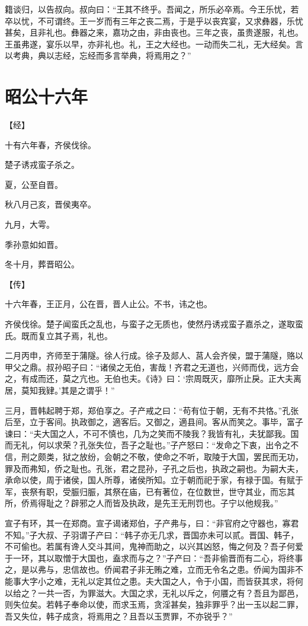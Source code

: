 \documentclass[a4paper,12pt,UTF8,twoside]{ctexbook}
\begin{document}
籍谈归，以告叔向。叔向曰：“王其不终乎。吾闻之，所乐必卒焉。今王乐忧，若卒以忧，不可谓终。王一岁而有三年之丧二焉，于是乎以丧宾宴，又求彝器，乐忧甚矣，且非礼也。彝器之来，嘉功之由，非由丧也。三年之丧，虽贵遂服，礼也。王虽弗遂，宴乐以早，亦非礼也。礼，王之大经也。一动而失二礼，无大经矣。言以考典，典以志经，忘经而多言举典，将焉用之？”


\section{昭公十六年}



【经】

十有六年春，齐侯伐徐。

楚子诱戎蛮子杀之。

夏，公至自晋。

秋八月己亥，晋侯夷卒。

九月，大雩。

季孙意如如晋。

冬十月，葬晋昭公。

【传】

十六年春，王正月，公在晋，晋人止公。不书，讳之也。

齐侯伐徐。楚子闻蛮氏之乱也，与蛮子之无质也，使然丹诱戎蛮子嘉杀之，遂取蛮氏。既而复立其子焉，礼也。

二月丙申，齐师至于蒲隧。徐人行成。徐子及郯人、莒人会齐侯，盟于蒲隧，赂以甲父之鼎。叔孙昭子曰：“诸侯之无伯，害哉！齐君之无道也，兴师而伐，远方会之，有成而还，莫之亢也。无伯也夫。《诗》曰：‘宗周既灭，靡所止戾。正大夫离居，莫知我肄。’其是之谓乎！”

三月，晋韩起聘于郑，郑伯享之。子产戒之曰：“苟有位于朝，无有不共恪。”孔张后至，立于客间。执政御之，適客后。又御之，適县间。客从而笑之。事毕，富子谏曰：“夫大国之人，不可不慎也，几为之笑而不陵我？我皆有礼，夫犹鄙我。国而无礼，何以求荣？孔张失位，吾子之耻也。”子产怒曰：“发命之下衷，出令之不信，刑之颇类，狱之放纷，会朝之不敬，使命之不听，取陵于大国，罢民而无功，罪及而弗知，侨之耻也。孔张，君之昆孙，子孔之后也，执政之嗣也。为嗣大夫，承命以使，周于诸侯，国人所尊，诸侯所知。立于朝而祀于家，有禄于国。有赋于军，丧祭有职，受脤归脤，其祭在庙，已有著位，在位数世，世守其业，而忘其所，侨焉得耻之？辟邪之人而皆及执政，是先王无刑罚也。子宁以他规我。”

宣子有环，其一在郑商。宣子谒诸郑伯，子产弗与，曰：“非官府之守器也，寡君不知。”子大叔、子羽谓子产曰：“韩子亦无几求，晋国亦未可以贰。晋国、韩子，不可偷也。若属有谗人交斗其间，鬼神而助之，以兴其凶怒，悔之何及？吾子何爱于一环，其以取憎于大国也，盍求而与之？”子产曰：“吾非偷晋而有二心，将终事之，是以弗与，忠信故也。侨闻君子非无贿之难，立而无令名之患。侨闻为国非不能事大字小之难，无礼以定其位之患。夫大国之人，令于小国，而皆获其求，将何以给之？一共一否，为罪滋大。大国之求，无礼以斥之，何餍之有？吾且为鄙邑，则失位矣。若韩子奉命以使，而求玉焉，贪淫甚矣，独非罪乎？出一玉以起二罪，吾又失位，韩子成贪，将焉用之？且吾以玉贾罪，不亦锐乎？”
\end{document}
